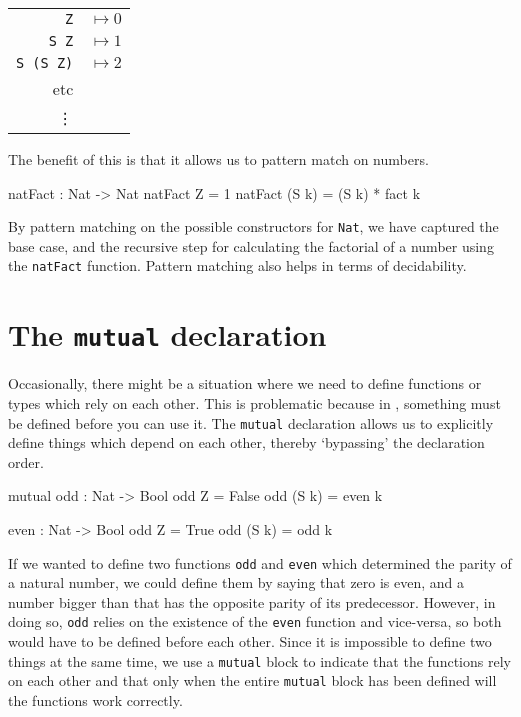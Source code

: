     \begin{tabular}{r l}
        \texttt{Z} & $\mapsto 0$ \\ 
        \texttt{S Z} & $\mapsto 1$ \\ 
        \texttt{S (S Z)} & $\mapsto 2$ \\
        etc & \\
        \vdots & \\
    \end{tabular}
    \par
    The benefit of this is that it allows us to pattern match on numbers.
    
    \begin{code}[caption={Pattern matching on \texttt{Nat}s}]
        natFact : Nat -> Nat
        natFact Z = 1
        natFact (S k) = (S k) * fact k
    \end{code}
    By pattern matching on the possible constructors for \texttt{Nat}, we have captured the base case, and the recursive step for calculating the factorial of a number using the \texttt{natFact} function.
    Pattern matching also helps in terms of decidability.
    \\


\section{The \texttt{mutual} declaration}
    Occasionally, there might be a situation where we need to define functions or types which rely on each other. This is problematic because in \Idris, something must be defined before you can use it. The \texttt{mutual} declaration allows us to explicitly define things which depend on each other, thereby `bypassing' the declaration order.
    
    \begin{code}[caption={Mutually declaring \texttt{odd} and \texttt{even}}]
        mutual
            odd : Nat -> Bool
            odd Z     = False
            odd (S k) = even k
            
            even : Nat -> Bool
            odd Z     = True
            odd (S k) = odd k
    \end{code}
    
    If we wanted to define two functions \texttt{odd} and \texttt{even} which determined the parity of a natural number, we could define them by saying that zero is even, and a number bigger than that has the opposite parity of its predecessor. However, in doing so, \texttt{odd} relies on the existence of the \texttt{even} function and vice-versa, so both would have to be defined before each other. Since it is impossible to define two things at the same time, we use a \texttt{mutual} block to indicate that the functions rely on each other and that only when the entire \texttt{mutual} block has been defined will the functions work correctly.


